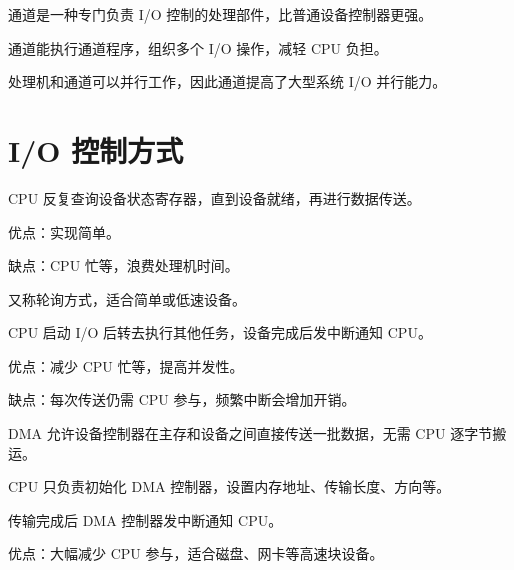 \begin{points}
  \item 通道是一种专门负责 I/O 控制的处理部件，比普通设备控制器更强。
  \item 通道能执行通道程序，组织多个 I/O 操作，减轻 CPU 负担。
  \item 处理机和通道可以并行工作，因此通道提高了大型系统 I/O 并行能力。
\end{points}


\section{I/O 控制方式}
\begin{points}
  \item CPU 反复查询设备状态寄存器，直到设备就绪，再进行数据传送。
  \item 优点：实现简单。
  \item 缺点：CPU 忙等，浪费处理机时间。
  \item 又称轮询方式，适合简单或低速设备。
\end{points}


\begin{points}
  \item CPU 启动 I/O 后转去执行其他任务，设备完成后发中断通知 CPU。
  \item 优点：减少 CPU 忙等，提高并发性。
  \item 缺点：每次传送仍需 CPU 参与，频繁中断会增加开销。
\end{points}


\begin{points}
  \item DMA 允许设备控制器在主存和设备之间直接传送一批数据，无需 CPU 逐字节搬运。
  \item CPU 只负责初始化 DMA 控制器，设置内存地址、传输长度、方向等。
  \item 传输完成后 DMA 控制器发中断通知 CPU。
  \item 优点：大幅减少 CPU 参与，适合磁盘、网卡等高速块设备。
\end{points}


